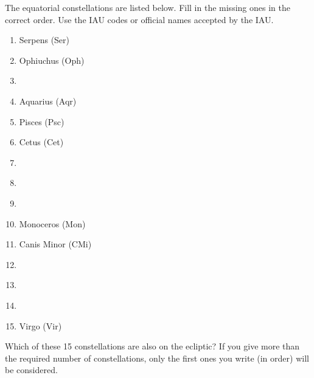 The equatorial constellations are listed below. Fill in the missing ones in
the correct order. Use the IAU codes or official names accepted by the IAU.

\begin{enumerate}
\item Serpens (Ser)
\item Ophiuchus (Oph)
\item \underline{\hspace{6em}}
\item Aquarius (Aqr)
\item Pisces (Psc)
\item Cetus (Cet)
\item \underline{\hspace{6em}}
\item \underline{\hspace{6em}}
\item \underline{\hspace{6em}}
\item Monoceros (Mon)
\item Canis Minor (CMi)
\item \underline{\hspace{6em}}
\item \underline{\hspace{6em}}
\item \underline{\hspace{6em}}
\item Virgo (Vir)
\end{enumerate}

Which of these 15 constellations are also on the ecliptic? If you give more
than the required number of constellations, only the first ones you write (in
order) will be considered.

